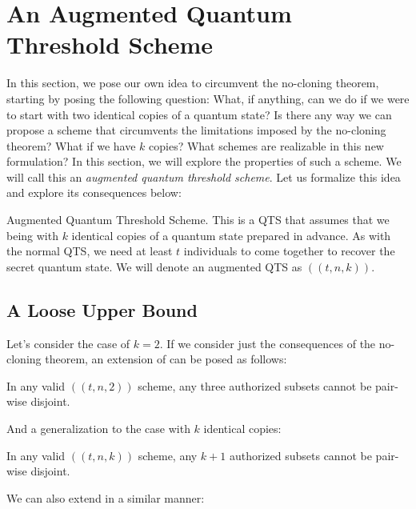 \chapter{An Augmented Quantum Threshold Scheme}
\label{ch3}

In this section, we pose our own idea to circumvent the no-cloning theorem, starting by posing the following question: What, if anything, can we do if we were to start with two identical copies of a quantum state? Is there any way we can propose a scheme that circumvents the limitations imposed by the no-cloning theorem? What if we have $k$ copies? What schemes are realizable in this new formulation? In this section, we will explore the properties of such a scheme. We will call this an \textit{augmented quantum threshold scheme}. Let us formalize this idea and explore its consequences below:

\theoremstyle{definition}
\begin{definition}{Augmented Quantum Threshold Scheme.}
    \label{defn:augmented-qts}
     This is a QTS that assumes that we being with $k$ identical copies of a quantum state prepared in advance. As with the normal QTS, we need at least $t$ individuals to come together to recover the secret quantum state. We will denote an augmented QTS as $((t,n,k))$.
\end{definition}

\section{A Loose Upper Bound}

Let's consider the case of $k=2$. If we consider just the consequences of the no-cloning theorem, an extension of  can be posed as follows:

\begin{theorem}
    \label{thm:three-authorized}
    In any valid $((t,n,2))$ scheme, any three authorized subsets cannot be pair-wise disjoint.
\end{theorem}

And a generalization to the case with $k$ identical copies:

\begin{theorem}
    \label{thm:k-authorized}
    In any valid $((t,n,k))$ scheme, any $k+1$ authorized subsets cannot be pair-wise disjoint.
\end{theorem}

We can also extend  in a similar manner:

